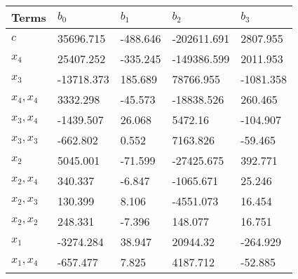 \begin{tabular}{lllll}
Terms & $b_0$ & $b_1$ & $b_2$ & $b_3$ \\ 
\hline 
$c$ & 35696.715 & -488.646 & -202611.691 & 2807.955 \\ 
$x_4$ & 25407.252 & -335.245 & -149386.599 & 2011.953 \\ 
$x_3$ & -13718.373 & 185.689 & 78766.955 & -1081.358 \\ 
$x_4,x_4$ & 3332.298 & -45.573 & -18838.526 & 260.465 \\ 
$x_3,x_4$ & -1439.507 & 26.068 & 5472.16 & -104.907 \\ 
$x_3,x_3$ & -662.802 & 0.552 & 7163.826 & -59.465 \\ 
$x_2$ & 5045.001 & -71.599 & -27425.675 & 392.771 \\ 
$x_2,x_4$ & 340.337 & -6.847 & -1065.671 & 25.246 \\ 
$x_2,x_3$ & 130.399 & 8.106 & -4551.073 & 16.454 \\ 
$x_2,x_2$ & 248.331 & -7.396 & 148.077 & 16.751 \\ 
$x_1$ & -3274.284 & 38.947 & 20944.32 & -264.929 \\ 
$x_1,x_4$ & -657.477 & 7.825 & 4187.712 & -52.885 \\ 
\hline 
\end{tabular}